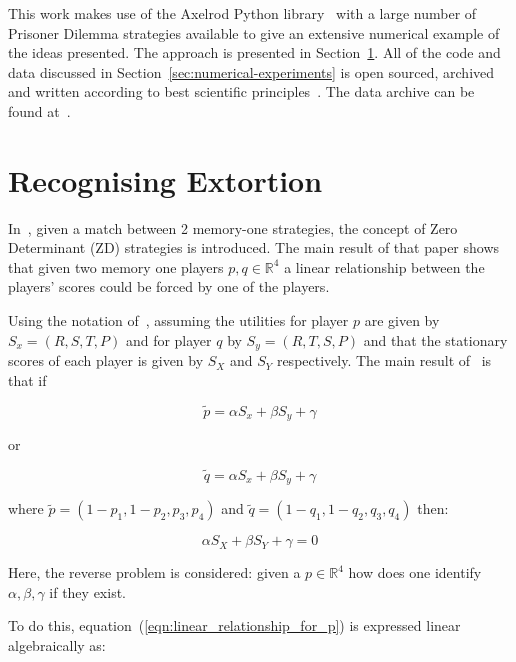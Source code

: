 \documentclass[a4paper]{article}
\begin{document}
This work makes use of the Axelrod Python library~\cite{Knight2018, Knight2016}
with a large number of Prisoner Dilemma strategies available to give an
extensive numerical example of the ideas presented.  The approach is presented
in Section~\ref{sec:delta-zd-strategies}.  All of the code and data discussed
in Section~\ref{sec:numerical-experiments} is open sourced, archived and
written according to best scientific principles~\cite{Wilson2014}. The data
archive can be found at~\cite{vincent_knight_2018_1297075}.

\section{Recognising Extortion}\label{sec:delta-zd-strategies}

In~\cite{Press2012}, given a match between 2 memory-one strategies, the concept
of Zero Determinant (ZD) strategies is introduced. The main result of that paper
shows that given two memory one players \(p, q\in\mathbb{R}^4\) a linear
relationship between the players' scores could be forced by one of the players.

Using the notation of~\cite{Press2012}, assuming the utilities for player \(p\)
are given by \(S_x=(R, S, T, P)\) and for player \(q\) by \(S_y=(R, T, S, P)\)
and that the stationary scores of each player is given by \(S_X\) and \(S_Y\)
respectively. The main result of~\cite{Press2012} is that if

\begin{equation}\label{eqn:linear_relationship_for_p}
    \tilde p=\alpha S_x + \beta S_y + \gamma
\end{equation}

or

\begin{equation}\label{eqn:linear_relationship_for_q}
    \tilde q=\alpha S_x + \beta S_y + \gamma
\end{equation}

where \(\tilde p = (1 - p_1, 1 - p_2, p_3, p_4)\) and
\(\tilde q = (1 - q_1, 1 - q_2, q_3, q_4)\) then:

\begin{equation}
    \alpha S_X + \beta S_Y + \gamma = 0
\end{equation}

Here, the reverse problem is considered: given a
\(p\in\mathbb{R}^4\) how does one identify \(\alpha, \beta, \gamma\) if they
exist.

To do this, equation~(\ref{eqn:linear_relationship_for_p}) is expressed linear
algebraically as:
\end{document}
